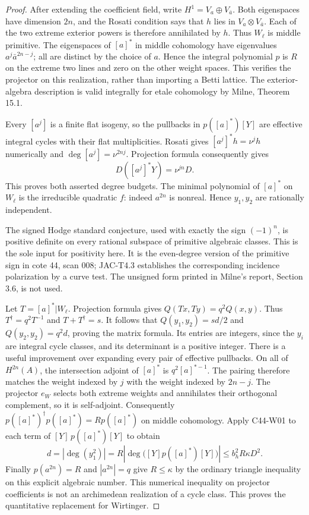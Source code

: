\documentclass[11pt]{article}
\theoremstyle{remark}\newtheorem{remark}[theorem]{Remark}
\begin{document}
\begin{proof}
After extending the coefficient field, write $H^1=V_a\oplus V_{\bar a}$.
Both eigenspaces have dimension $2n$, and the Rosati condition says
that $h$ lies in $V_a\otimes V_{\bar a}$.  Each of the two extreme
exterior powers is therefore annihilated by $h$.  Thus $W_\ell$ is
middle primitive.  The eigenspaces of $[a]^*$ in middle cohomology
have eigenvalues $a^j\bar a^{2n-j}$; all are distinct by the choice
of $a$.  Hence the integral polynomial $p$ is $R$ on the extreme
two lines and zero on the other weight spaces.  This verifies the
projector on this realization, rather than importing a Betti lattice.
The exterior-algebra description is valid integrally for etale
cohomology by Milne, Theorem 15.1.

Every $[a^j]$ is a finite flat isogeny, so the pullbacks in
$p([a]^*)[Y]$ are effective integral cycles with their flat
multiplicities.  Rosati gives $[a^j]^*h=\nu^jh$ numerically and
$\deg[a^j]=\nu^{2nj}$.  Projection formula consequently gives
\[
 D([a^j]^*Y)=\nu^{jn}D.
\]
This proves both asserted degree budgets.  The minimal polynomial
of $[a]^*$ on $W_\ell$ is the irreducible quadratic $f$: indeed
$a^{2n}$ is nonreal.  Hence $y_1,y_2$ are rationally independent.

The signed Hodge standard conjecture, used with exactly the sign
$(-1)^n$, is positive definite on every rational subspace of
primitive algebraic classes.  This is the sole input for positivity
here.  It is the even-degree version of the primitive sign in
cote 44, scan 008; JAC-T4.3 establishes the corresponding incidence
polarization by a curve test.  The unsigned form printed in
Milne's report, Section 3.6, is not used.

Let $T=[a]^*|W_\ell$.  Projection formula gives
$Q(Tx,Ty)=q^2Q(x,y)$.  Thus $T^\dagger=q^2T^{-1}$ and
$T+T^\dagger=s$.  It follows that
$Q(y_1,y_2)=sd/2$ and $Q(y_2,y_2)=q^2d$, proving the matrix
formula.  Its entries are integers, since the $y_i$ are integral
cycle classes, and its determinant is a positive integer.
There is a useful improvement over expanding every pair of effective
pullbacks.  On all of $H^{2n}(A)$, the intersection adjoint of
$[a]^*$ is $q^2[a]^{*-1}$.  The pairing therefore matches the
weight indexed by $j$ with the weight indexed by $2n-j$.
The projector $e_W$ selects both extreme weights and annihilates
their orthogonal complement, so it is self-adjoint.  Consequently
$p([a]^*)^\dagger p([a]^*)=R p([a]^*)$ on middle cohomology.
Apply C44-W01 to each term of $[Y]\,p([a]^*)[Y]$ to obtain
\[
 d=|\deg(y_1^2)|=R\left|\deg\bigl([Y]p([a]^*)[Y]\bigr)\right|
 \leq b_h^2R\kappa D^2.
\]
Finally $p(a^{2n})=R$ and $|a^{2n}|=q$ give $R\leq\kappa$
by the ordinary triangle inequality on this explicit algebraic number.
This numerical inequality on projector coefficients is not an
archimedean realization of a cycle class.
This proves the quantitative replacement for Wirtinger.


\end{proof}
\end{document}
